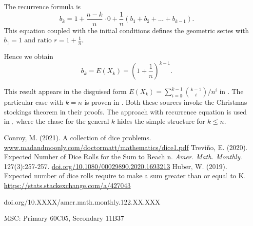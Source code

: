 \documentclass{article}
\theoremstyle{plain}
\begin{document}
\begin{filler}
The recurrence formula is
\[
b_k = 1 + \frac{n - k}{n} \cdot 0 + \frac{1}{n} (b_1 + b_2 + \ldots + b_{k-1}).
\]
This equation coupled with the initial conditions defines the geometric series with $b_1 = 1$ and ratio $r = 1 + \frac{1}{n}$.

Hence we obtain
\[
b_k = E(X_k) = \left( 1 + \frac{1}{n} \right)^{k-1}.
\]


This result appears in the disguised form $E(X_k) = \sum_{i=0}^{k-1} \binom{k-1}{i} / n^i$ in \cite{conroy2021collection}.
The particular case with $k=n$ is proven in \cite{trevino2020expected}.
Both these sources invoke the Christmas stockings theorem in their proofs.
The approach with recurrence equation is used in \cite{427043}, 
where the chase for the general $k$ hides the simple structure for $k\leq n$. 


\begin{thebibliography}{1}
 Conroy, M. (2021). A collection of dice problems. \url{www.madandmoonly.com/doctormatt/mathematics/dice1.pdf}
 Trevi{\~n}o, E. (2020). Expected Number of Dice Rolls for the Sum to Reach n. \textit{Amer. Math. Monthly}. 127(3):257-257.
\url{doi.org/10.1080/00029890.2020.1693213}
 Huber, W. (2019). Expected number of dice rolls require to make a sum greater than or equal to K. \url{https://stats.stackexchange.com/a/427043}
\end{thebibliography}




\bigskip
\footnoterule
\footnotesize{doi.org/10.XXXX/amer.math.monthly.122.XX.XXX}

\footnotesize{MSC: Primary 60C05, Secondary 11B37}



\end{filler}
\end{document}
